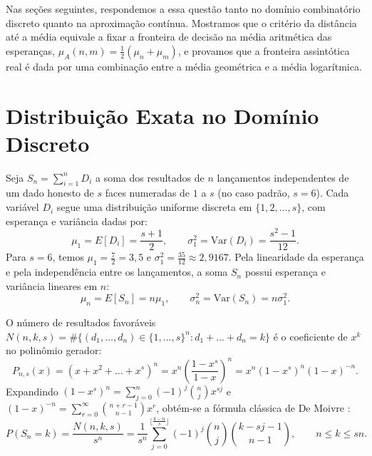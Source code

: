 \documentclass[11pt,a4paper]{article}
\theoremstyle{definition}
\theoremstyle{remark}
\begin{document}
Nas seções seguintes, respondemos a essa questão tanto no domínio combinatório discreto quanto na aproximação contínua. Mostramos que o critério da distância até a média equivale a fixar a fronteira de decisão na média aritmética das esperanças, $\mu_A(n,m) = \frac{1}{2}(\mu_n + \mu_m)$, e provamos que a fronteira assintótica real é dada por uma combinação entre a média geométrica e a média logarítmica.

\section{Distribuição Exata no Domínio Discreto}

Seja $S_n = \sum_{i=1}^n D_i$ a soma dos resultados de $n$ lançamentos independentes de um dado honesto de $s$ faces numeradas de $1$ a $s$ (no caso padrão, $s = 6$). Cada variável $D_i$ segue uma distribuição uniforme discreta em $\{1, 2, \dots, s\}$, com esperança e variância dadas por:
\begin{equation}
\mu_1 = E[D_i] = \frac{s + 1}{2}, \qquad \sigma_1^2 = \text{Var}(D_i) = \frac{s^2 - 1}{12}.
\label{eq:parametros_1d}
\end{equation}
Para $s = 6$, temos $\mu_1 = \frac{7}{2} = 3{,}5$ e $\sigma_1^2 = \frac{35}{12} \approx 2{,}9167$. Pela linearidade da esperança e pela independência entre os lançamentos, a soma $S_n$ possui esperança e variância lineares em $n$:
\begin{equation}
\mu_n = E[S_n] = n\mu_1, \qquad \sigma_n^2 = \text{Var}(S_n) = n\sigma_1^2.
\label{eq:parametros_nd}
\end{equation}

O número de resultados favoráveis $N(n, k, s) = \#\{(d_1,\dots,d_n) \in \{1,\dots,s\}^n : d_1 + \dots + d_n = k\}$ é o coeficiente de $x^k$ no polinômio gerador:
\begin{equation}
P_{n,s}(x) = \left(x + x^2 + \dots + x^s\right)^n = x^n \left(\frac{1 - x^s}{1 - x}\right)^n = x^n (1 - x^s)^n (1 - x)^{-n}.
\end{equation}
Expandindo $(1 - x^s)^n = \sum_{j=0}^n (-1)^j \binom{n}{j} x^{sj}$ e $(1 - x)^{-n} = \sum_{r=0}^\infty \binom{n + r - 1}{n - 1} x^r$, obtém-se a fórmula clássica de De Moivre \cite{demoivre1711,uspensky1937,feller1968}:
\begin{equation}
P(S_n = k) = \frac{N(n, k, s)}{s^n} = \frac{1}{s^n} \sum_{j=0}^{\lfloor \frac{k - n}{s} \rfloor} (-1)^j \binom{n}{j} \binom{k - sj - 1}{n - 1},
\qquad n \le k \le sn.
\label{eq:demoivre}
\end{equation}
\end{document}
